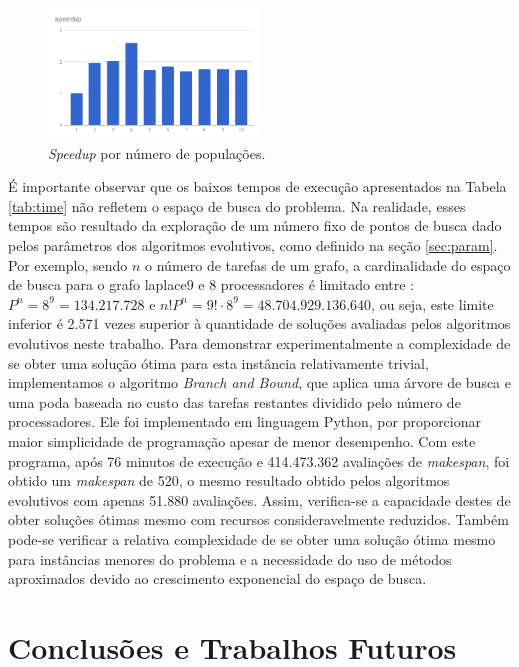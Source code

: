 \documentclass[fleqn,10pt]{SelfArx} %
\begin{document}
\begin{figure}[h]
\centering
\includegraphics[width=0.5\textwidth]{speedup.png}
\caption{\textit{Speedup} por número de populações.}
\label{fig:speedup}
\end{figure}

É importante observar que os baixos tempos de execução apresentados na Tabela \ref{tab:time} não refletem o espaço de busca do problema. Na realidade, esses tempos são resultado da exploração de um número fixo de pontos de busca dado pelos parâmetros dos algoritmos evolutivos, como definido na seção \ref{sec:param}. Por exemplo, sendo $n$ o número de tarefas de um grafo, a cardinalidade do espaço de busca para o grafo laplace9 e 8 processadores é limitado entre \cite{Morady}: $P^n = 8^9 = 134.217.728$ e $n!P^n = 9! \cdot 8^9 = 48.704.929.136.640$, ou seja, este limite inferior é 2.571 vezes superior à quantidade de soluções avaliadas pelos algoritmos evolutivos neste trabalho. Para demonstrar experimentalmente a complexidade de se obter uma solução ótima para esta instância relativamente trivial, implementamos o algoritmo \textit{Branch and Bound}, que aplica uma árvore de busca e uma poda baseada no custo das tarefas restantes dividido pelo número de processadores. Ele foi implementado em linguagem Python, por proporcionar maior simplicidade de programação apesar de menor desempenho. Com este programa, após 76 minutos de execução e 414.473.362 avaliações de \textit{makespan}, foi obtido um \textit{makespan} de 520, o mesmo resultado obtido pelos algoritmos evolutivos com apenas 51.880 avaliações. Assim, verifica-se a capacidade destes de obter soluções ótimas mesmo com recursos consideravelmente reduzidos. Também pode-se verificar a relativa complexidade de se obter uma solução ótima mesmo para instâncias menores do problema e a necessidade do uso de métodos aproximados devido ao crescimento exponencial do espaço de busca.



\section{Conclusões e Trabalhos Futuros}
\end{document}
